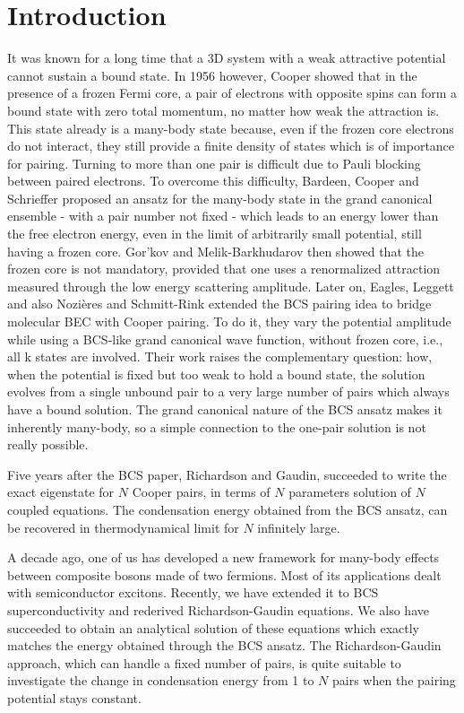\documentclass[5p,twocolumn]{elsarticle}
\begin{document}
\section{Introduction}
It was known for a long time that a 3D system with a weak attractive potential cannot sustain a bound state.  In 1956 however, Cooper showed that in the presence of a frozen Fermi core, a pair of electrons with opposite spins can form a bound state with zero total momentum,  no matter how weak the attraction is\cite{Cooper}.  This state already is a many-body state because, even if the frozen core electrons do not interact, they still provide a finite density of states which is of importance for pairing. Turning to more than one pair is difficult due to Pauli blocking between paired electrons. To overcome this difficulty, Bardeen, Cooper and Schrieffer proposed an ansatz for the many-body state in the grand canonical ensemble - with a pair number not fixed - which leads to an energy lower than the free electron energy, even in the limit of arbitrarily small potential, still having a frozen core\cite{BCS}. Gor'kov and Melik-Barkhudarov then showed that the frozen core is not mandatory, provided that one uses a renormalized attraction measured through the low energy scattering amplitude\cite{Gorkov}.   Later on, Eagles\cite{Eagle}, Leggett\cite{LeggettCrossover} and also Nozi\`{e}res and Schmitt-Rink\cite{Nozieres} extended the BCS pairing idea to bridge molecular BEC with Cooper pairing. To do it, they vary the potential amplitude while using a BCS-like grand canonical wave function, without frozen core, i.e., all k states are involved.  Their work raises the complementary question: how, when the potential is fixed but too weak to hold a bound state, the solution evolves from a single unbound pair to a very large number of pairs which always have  a bound solution. The grand canonical nature of the BCS ansatz makes it inherently many-body, so a simple connection to the one-pair solution is not really possible.  

Five years after the BCS paper, Richardson\cite{Richardson1} and Gaudin\cite{gaudin}, succeeded to write the exact eigenstate for $N$ Cooper pairs, in terms of $N$ parameters solution of $N$ coupled equations. The condensation energy obtained from the BCS ansatz, can be recovered in thermodynamical limit for $N$ infinitely large\cite{Richardson2,Richardson3,Richardson1968}. 

A decade ago, one of us has developed a new framework\cite{CobosonPhysicsReports} for many-body effects between composite bosons made of two fermions. Most of its applications dealt with semiconductor excitons.   Recently, we have extended it to BCS superconductivity and rederived Richardson-Gaudin equations\cite{CobosonBcsRich}. We also have succeeded to obtain an analytical solution of these equations which exactly matches the energy obtained through the BCS ansatz\cite{CombescotCooper,combescotBCS}.  The Richardson-Gaudin approach, which can handle a fixed number of pairs, is quite suitable to investigate the change in condensation energy from 1 to $N$ pairs when the pairing potential stays constant.
\end{document}
